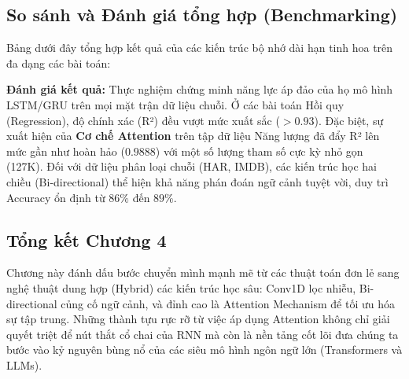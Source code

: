 \subsection{So sánh và Đánh giá tổng hợp (Benchmarking)}
Bảng dưới đây tổng hợp kết quả của các kiến trúc bộ nhớ dài hạn tinh hoa trên đa dạng các bài toán:

\begin{table}[H]
    \centering
    \caption{Bảng so sánh hiệu năng các mô hình Bộ nhớ dài hạn trong Chương 4}
    \label{tab:lstm_comparison}
\end{table}

\textbf{Đánh giá kết quả:}
Thực nghiệm chứng minh năng lực áp đảo của họ mô hình LSTM/GRU trên mọi mặt trận dữ liệu chuỗi. Ở các bài toán Hồi quy (Regression), độ chính xác (R²) đều vượt mức xuất sắc ($> 0.93$). Đặc biệt, sự xuất hiện của \textbf{Cơ chế Attention} trên tập dữ liệu Năng lượng đã đẩy R² lên mức gần như hoàn hảo ($0.9888$) với một số lượng tham số cực kỳ nhỏ gọn (127K). Đối với dữ liệu phân loại chuỗi (HAR, IMDB), các kiến trúc học hai chiều (Bi-directional) thể hiện khả năng phán đoán ngữ cảnh tuyệt vời, duy trì Accuracy ổn định từ $86\%$ đến $89\%$.

\subsection{Tổng kết Chương 4}
Chương này đánh dấu bước chuyển mình mạnh mẽ từ các thuật toán đơn lẻ sang nghệ thuật dung hợp (Hybrid) các kiến trúc học sâu: Conv1D lọc nhiễu, Bi-directional củng cố ngữ cảnh, và đỉnh cao là Attention Mechanism để tối ưu hóa sự tập trung. Những thành tựu rực rỡ từ việc áp dụng Attention không chỉ giải quyết triệt để nút thắt cổ chai của RNN mà còn là nền tảng cốt lõi đưa chúng ta bước vào kỷ nguyên bùng nổ của các siêu mô hình ngôn ngữ lớn (Transformers và LLMs).
